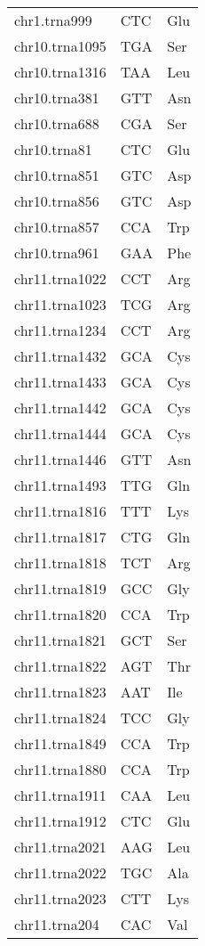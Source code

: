 \begin{longtable}{@{}l>{\collectcell\anticodon}l<{\endcollectcell}l@{}}
    chr1.trna999 & CTC & Glu \\
    chr10.trna1095 & TGA & Ser \\
    chr10.trna1316 & TAA & Leu \\
    chr10.trna381 & GTT & Asn \\
    chr10.trna688 & CGA & Ser \\
    chr10.trna81 & CTC & Glu \\
    chr10.trna851 & GTC & Asp \\
    chr10.trna856 & GTC & Asp \\
    chr10.trna857 & CCA & Trp \\
    chr10.trna961 & GAA & Phe \\
    chr11.trna1022 & CCT & Arg \\
    chr11.trna1023 & TCG & Arg \\
    chr11.trna1234 & CCT & Arg \\
    chr11.trna1432 & GCA & Cys \\
    chr11.trna1433 & GCA & Cys \\
    chr11.trna1442 & GCA & Cys \\
    chr11.trna1444 & GCA & Cys \\
    chr11.trna1446 & GTT & Asn \\
    chr11.trna1493 & TTG & Gln \\
    chr11.trna1816 & TTT & Lys \\
    chr11.trna1817 & CTG & Gln \\
    chr11.trna1818 & TCT & Arg \\
    chr11.trna1819 & GCC & Gly \\
    chr11.trna1820 & CCA & Trp \\
    chr11.trna1821 & GCT & Ser \\
    chr11.trna1822 & AGT & Thr \\
    chr11.trna1823 & AAT & Ile \\
    chr11.trna1824 & TCC & Gly \\
    chr11.trna1849 & CCA & Trp \\
    chr11.trna1880 & CCA & Trp \\
    chr11.trna1911 & CAA & Leu \\
    chr11.trna1912 & CTC & Glu \\
    chr11.trna2021 & AAG & Leu \\
    chr11.trna2022 & TGC & Ala \\
    chr11.trna2023 & CTT & Lys \\
    chr11.trna204 & CAC & Val \\

\end{longtable}
